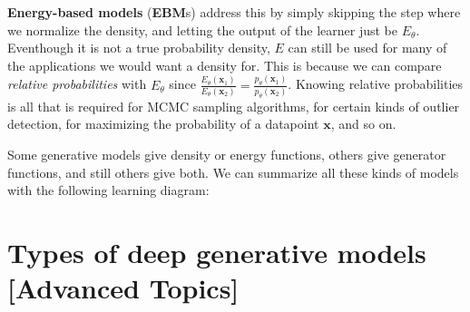 \textbf{Energy-based models} (\textbf{EBM}s) address this by simply skipping the step where we normalize the density, and letting the output of the learner just be $E_\theta$. Eventhough it is not a true probability density, $E$ can still be used for many of the applications we would want a density for. This is because we can compare \textit{relative probabilities} with $E_\theta$ since $\frac{E_\theta(\mathbf{x}_1)}{E_\theta(\mathbf{x}_2)} = \frac{p_\theta(\mathbf{x}_1)}{p_\theta(\mathbf{x}_2)}$. Knowing relative probabilities is all that is required for MCMC sampling algorithms, for certain kinds of outlier detection, for maximizing the probability of a datapoint $\mathbf{x}$, and so on.


\newpage
Some generative models give density or energy functions, others give generator functions, and still others give both. We can summarize all these kinds of models with the following learning diagram: %
\begin{center}
\end{center}



\section{Types of deep generative models {\small[Advanced Topics]}}


